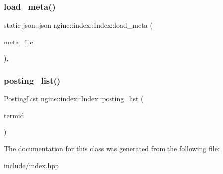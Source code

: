 \mbox{\label{classngine_1_1index_1_1Index_a26301d022347cd6756fd3974a6535f15}} 
\subsubsection{\texorpdfstring{load\+\_\+meta()}{load\_meta()}}
{\footnotesize\ttfamily static json\+::json ngine\+::index\+::\+Index\+::load\+\_\+meta (\begin{DoxyParamCaption}\item[{fs\+::path}]{meta\+\_\+file }\end{DoxyParamCaption})\hspace{0.3cm}{\ttfamily [inline]}, {\ttfamily [static]}}

\mbox{\label{classngine_1_1index_1_1Index_a16ee97b24b45a756150e5e6457cacfbf}} 
\subsubsection{\texorpdfstring{posting\+\_\+list()}{posting\_list()}}
{\footnotesize\ttfamily \hyperlink{classngine_1_1PostingList}{Posting\+List} ngine\+::index\+::\+Index\+::posting\+\_\+list (\begin{DoxyParamCaption}\item[{\hyperlink{structngine_1_1TermId}{Term\+Id}}]{termid }\end{DoxyParamCaption})\hspace{0.3cm}{\ttfamily [inline]}}



The documentation for this class was generated from the following file\+:\begin{DoxyCompactItemize}
\item 
include/\hyperlink{index_8hpp}{index.\+hpp}\end{DoxyCompactItemize}
